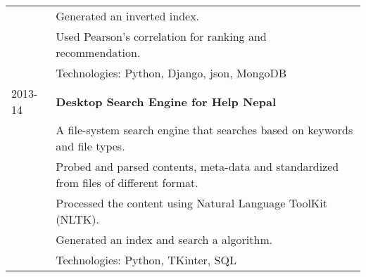 \documentclass[letterpaper,10pt,oneside]{article}
\newcommand{\nextitem}{\par\hspace*{\labelsep}\textbullet\hspace*{\labelsep}}
\begin{document}
\begin{tabular}{l l}
         & \footnotesize{\nextitem Generated an inverted index.} \\
         & \footnotesize{\nextitem Used Pearson's correlation for ranking and recommendation.} \\
         & Technologies: Python, Django, json, MongoDB \\
 2013-14 & \textbf{Desktop Search Engine for Help Nepal} \\
         & A file-system search engine that searches based on keywords and file types. \\
         & \footnotesize{\nextitem Probed and parsed contents, meta-data and standardized from files of different format.} \\
         & \footnotesize{\nextitem Processed the content using Natural Language ToolKit (NLTK).} \\
         & \footnotesize{\nextitem Generated an index and search a algorithm.} \\
         & Technologies: Python, TKinter, SQL \\
\end{tabular}
\end{document}
